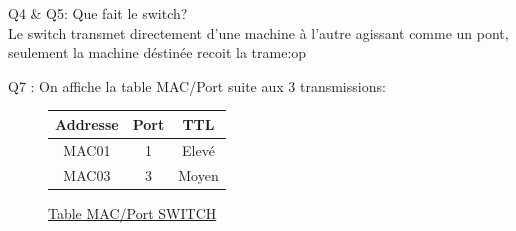 \documentclass[11pt]{book}
\newcommand{\ul}{\underline}
\begin{document}
         \begin{dent}{Q4 \& Q5:} Que fait le switch?\\
            Le switch transmet directement d'une machine à l'autre agissant comme un pont, seulement la machine déstinée recoit la trame:op
             
          \end{dent}
         

        \begin{dent}{Q7 :} On affiche la table MAC/Port suite aux 3 transmissions:
            \begin{figure}[ht]
                \centering
                \begin{tabular}{c|c|c}
                    Addresse & Port & TTL\\
                    \hline
                    MAC01 & 1 & Elevé \\
                    \hline
                    MAC03 & 3 & Moyen \\
                \end{tabular}
                \caption{\ul{Table MAC/Port SWITCH}}
            \end{figure}
         \end{dent}
        
\end{document}
